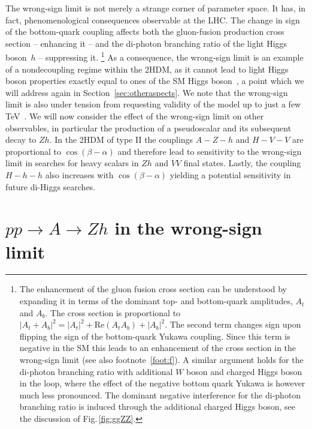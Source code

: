 \documentclass[12pt]{article}
\newcommand{\abbrev}{\scalefont{.9}}
\newcommand{\fig}[1]{Fig.\,\ref{#1}}
\newcommand{\sct}[1]{Section~\ref{#1}}
\newcommand{\lhc}{{\abbrev LHC}}
\newcommand{\sm}{{\abbrev SM}}
\newcommand{\thdm}{{\abbrev 2HDM}}
\begin{document}
The wrong-sign limit is not merely a strange corner of parameter space. It has, in fact, phenomenological
consequences observable at the \lhc{}.
The change in sign of the bottom-quark coupling affects both the gluon-fusion production cross section --
enhancing it -- and the di-photon branching ratio of the light Higgs boson~$h$ -- suppressing it.
\footnote{The enhancement of the gluon fusion cross section can be understood by expanding it in terms of the dominant top- and bottom-quark amplitudes, $A_t$ and $A_b$.
The cross section is proportional to $|A_t+A_b|^2=|A_t|^2+\text{Re}(A_tA_b)+|A_b|^2$.
The second term changes sign upon flipping the sign of the bottom-quark Yukawa coupling.
Since this term is negative in the \sm{} this leads to an enhancement of the cross section in the wrong-sign limit (see also footnote~\ref{foot:f}).
A similar argument holds for the di-photon branching ratio with
additional $W$ boson and charged Higgs boson in the loop, where
the effect of the negative bottom quark Yukawa is however
much less pronounced.
The dominant negative interference for the di-photon
branching ratio is induced through the
additional charged Higgs boson, see the discussion of \fig{fig:ggZZ}.}
As a consequence, the wrong-sign limit is an example of a nondecoupling regime within the \thdm{}, as
it cannot lead to light Higgs boson properties exactly equal to ones of the \sm{} Higgs
boson~\cite{Ferreira:2014naa}, a point which we will address again in \sct{sec:otheraspects}.
We note that the wrong-sign limit is also under tension from requesting validity of the model up to
just a few TeV~\cite{Basler:2017nzu}.
We will now consider the effect of the wrong-sign limit on other observables, in particular the production
of a pseudoscalar and its subsequent decay to $Zh$.
In the \thdm{} of type II the couplings $A-Z-h$ and $H-V-V$ are proportional to $\cos(\beta-\alpha)$ and
therefore lead to sensitivity to the wrong-sign limit in searches for heavy scalars in $Zh$ and $VV$ final states.
Lastly, the coupling $H-h-h$ also increases with $\cos(\beta-\alpha)$ yielding a potential sensitivity
in future di-Higgs searches.

\section{$pp \to A\to Zh$ in the wrong-sign limit}
\label{sec:ppAZh}
\end{document}
